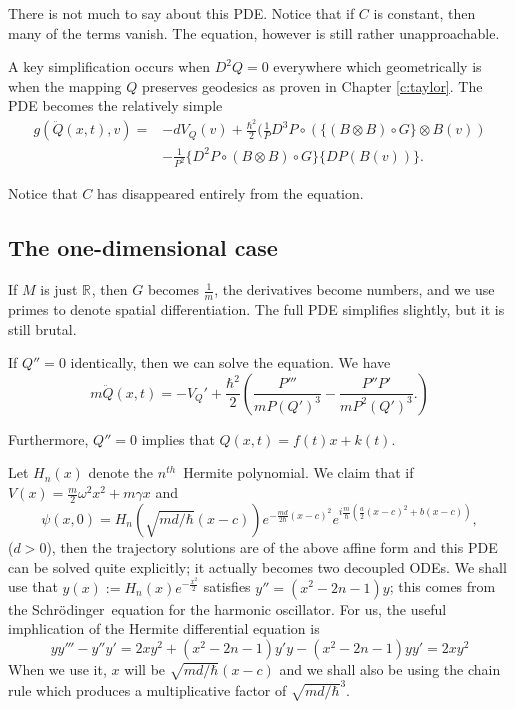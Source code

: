\documentclass[11pt]{article}
\theoremstyle{remark}
\begin{document}
There is not much to say about this PDE. Notice that if $C$ is
constant, then many of the terms vanish. The equation, however is
still rather unapproachable.


A key simplification occurs when  $D^2Q = 0$ everywhere which
  geometrically is when the mapping $Q$ preserves geodesics as
  proven in Chapter \ref{c:taylor}. 
The PDE becomes the relatively simple
\[
\begin{split}
g(\ddot{Q}(x,t),v ) = & -dV_{Q} (v) + \frac{\ensuremath{\hbar}^2}{2}(
\frac{1}{P} 
 D^3 P \circ ( \{(B\otimes B)\circ G\} \otimes B(v) )
\\ &
- \frac{1}{P^2}   
\{ D^2 P 
\circ(B\otimes B)\circ G
 \} 
\{ DP  (B (v)) \}.   
\end{split}   
\]


Notice that $C$ has disappeared entirely from the equation. 


\subsection{The one-dimensional case}

If $M$ is just \ensuremath{\mathbb{R}^{}}, then $G$ becomes $\frac{1}{m}$, the
derivatives become numbers, and we use primes to denote
spatial differentiation. The full PDE 
simplifies slightly,  but it is still brutal. 

If $Q'' = 0$ identically, then we can solve the equation. We have
\[
m \ddot{Q}(x,t)  =  - V_{Q}'  + \frac{\ensuremath{\hbar}^2}{2}(
\frac{P'''}{m P (Q')^{3} } 
- \frac{P''P'}{m P^2 (Q')^3}.)   
\]


Furthermore, $Q'' =0$ implies that $Q(x,t) = f(t) x + k(t)$. 

Let $H_n (x)$ denote the \ensuremath{{n}^{th}}\ Hermite polynomial. 
We claim that if $V(x) = \frac{m}{2} \omega^2 x^2 + m \gamma x
$ and 
\[\ensuremath{\psi}(x,0) =
H_n(\sqrt{md/\ensuremath{\hbar}}(x-c))  e^{-\frac{md}{2\ensuremath{\hbar}} (x-c)^2} e^{i\frac{m}{\ensuremath{\hbar}}
(\frac{a}{2} (x-c)^2 +b(x-c))},\] ($d>0$), 
then the trajectory solutions are of the above affine form and this PDE can be
solved quite explicitly; it actually becomes two decoupled ODEs.  We shall
use  that $y(x) \ensuremath{:=} H_n(x)e^{-\frac{x^2}{2}}$ satisfies $y'' = (x^2- 2n
-1)y$; this comes from the Schr\"odinger\ equation for the harmonic oscillator. 
For us, the useful imphlication of the Hermite differential equation is 
\[
y y''' -y'' y' = 2x y^2 +(x^2 -2n-1)y'y -(x^2 -2n-1)yy' = 2xy^2
\]
When we use it, $x$ will be $\sqrt{md/\ensuremath{\hbar}}(x-c)$ and we shall
also be using the chain rule which produces a multiplicative factor of 
$\sqrt{md/\ensuremath{\hbar}}^{3}$.
\end{document}
